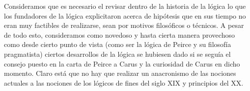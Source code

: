 \documentclass[
  structure  = article,
  pagelayout = periodicalaureo,%
  secfont    = italic,
  subsecfont = italic,
  version    = final,%
]{suftesi}
\begin{document}
Consideramos que es necesario el revisar dentro de la historia de la lógica lo que los fundadores de la lógica explicitaron acerca de hipótesis que en sus tiempo no eran muy factibles de realizarse, sean por motivos filosóficos o técnicos. A pesar de todo esto, consideramos como novedoso y hasta cierta manera provechoso como desde cierto punto de vista (como ser la lógica de Peirce y su filosofía pragmatista) ciertos desarrollos de la lógica se hubiesen dado si se seguía el consejo puesto en la carta de Peirce a Carus y la curiosidad de Carus en dicho momento. Claro está que no hay que realizar un anacronismo de las nociones actuales a las nociones de los lógicos de fines del siglo XIX y principios del XX.


\printbibliography
\nocite{peirce1931}
\end{document}
